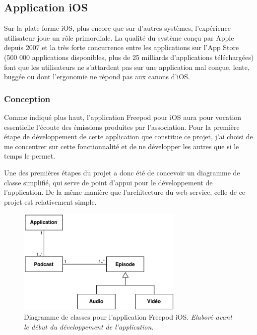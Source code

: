 \documentclass[11pt, french]{report}
\begin{document}
\subsection{Application iOS}

Sur la plate-forme iOS, plus encore que sur d'autres systèmes, l'expérience utilisateur joue un rôle primordiale. La qualité du système conçu par Apple depuis 2007 et la très forte concurrence entre les applications sur l'App Store (500 000 applications disponibles, plus de 25 milliards d'applications téléchargées) font que les utilisateurs ne s'attardent pas sur une application mal conçue, lente, buggée ou dont l'ergonomie ne répond pas aux canons d'iOS.

\subsubsection{Conception}

Comme indiqué plus haut, l'application Freepod pour iOS aura pour vocation essentielle l'écoute des émissions produites par l'association. Pour la première étape de développement de cette application que constitue ce projet, j'ai choisi de me concentrer sur cette fonctionnalité et de ne développer les autres que si le temps le permet.

Une des premières étapes du projet a donc été de concevoir un diagramme de classe simplifié, qui serve de point d'appui pour le développement de l'application. De la même manière que l'architecture du web-service, celle de ce projet est relativement simple.

\begin{figure}[!h]
	\begin{center}
	\includegraphics[width=8cm]{diag_class.png}
	\caption{\small{Diagramme de classes pour l'application Freepod iOS. \textit{Elaboré avant le début du développement de l'application.}}} \label{classes}
	\end{center}
\end{figure}
\end{document}
